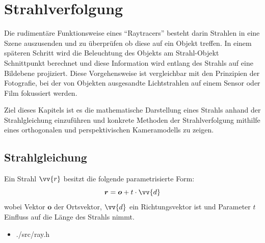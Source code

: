 \chapter{Strahlverfolgung}\label{ch:strahlerzeugung}

Die rudimentäre Funktionsweise eines "`Raytracers"' besteht darin Strahlen in eine Szene auszusenden und zu überprüfen ob diese auf ein Objekt treffen. In einem späteren Schritt wird die Beleuchtung des Objekts am Strahl-Objekt Schnittpunkt berechnet und diese Information wird entlang des Strahls auf eine Bildebene projiziert. Diese Vorgehensweise ist vergleichbar mit den Prinzipien der Fotografie, bei der von Objekten ausgesandte Lichtstrahlen auf einem Sensor oder Film fokussiert werden.

Ziel dieses Kapitels ist es die mathematische Darstellung eines Strahls anhand der Strahlgleichung einzuführen und konkrete Methoden der Strahlverfolgung mithilfe eines orthogonalen und perspektivischen Kameramodells zu zeigen.



\section{Strahlgleichung}

Ein Strahl $\vv{r}$ besitzt die folgende parametrisierte Form:
\begin{equation}
\label{eq:Strahlgleichung}
\boldsymbol{r} = \boldsymbol{o} + t \cdot \vv{d}
\end{equation}
wobei Vektor $\boldsymbol{o}$ der Ortsvektor, $\vv{d}$ ein Richtungsvektor ist und Parameter $t$ Einfluss auf die Länge des Strahls nimmt.

\begin{quell}
    \begin{itemize}
        \item ./src/ray.h
    \end{itemize}
    
\end{quell}